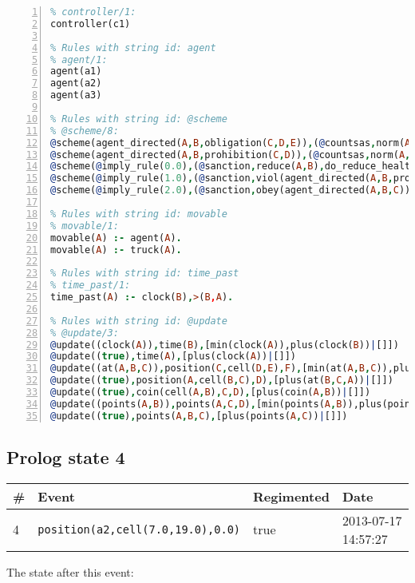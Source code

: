 \documentclass[11pt]{article}\usepackage[utf8]{inputenc}\usepackage{geometry}
\begin{document}
\begin{lstlisting}[language=Prolog, numbers=left]
% Rules with string id: controller
% controller/1:
controller(c1)

% Rules with string id: agent
% agent/1:
agent(a1)
agent(a2)
agent(a3)

% Rules with string id: @scheme
% @scheme/8:
@scheme(agent_directed(A,B,obligation(C,D,E)),(@countsas,norm(A,B,F,obligation(C,D,E)),F),false,(listTrue(C)),(time_past(D)),false,[plus(viol(agent_directed(A,B,obligation(C,D,E))))|[]],[plus(obey(agent_directed(A,B,obligation(C,D,E))))|[]])
@scheme(agent_directed(A,B,prohibition(C,D)),(@countsas,norm(A,B,E,prohibition(C,D)),E),(listTrue(C)),false,(false),false,[plus(viol(agent_directed(A,B,prohibition(C,D))))|[]],[plus(obey(agent_directed(A,B,prohibition(C,D))))|[]])
@scheme(@imply_rule(0.0),(@sanction,reduce(A,B),do_reduce_health(A,B),notifyAgent(A,changed(status))),true,false,false,false,[min(reduce(A,B))|[]],[])
@scheme(@imply_rule(1.0),(@sanction,viol(agent_directed(A,B,prohibition(C,D))),do_sanction(D)),true,false,false,false,[min(viol(agent_directed(A,B,prohibition(C,D))))|[]],[])
@scheme(@imply_rule(2.0),(@sanction,obey(agent_directed(A,B,C))),true,false,false,false,[min(obey(agent_directed(A,B,C)))|[]],[])

% Rules with string id: movable
% movable/1:
movable(A) :- agent(A).
movable(A) :- truck(A).

% Rules with string id: time_past
% time_past/1:
time_past(A) :- clock(B),>(B,A).

% Rules with string id: @update
% @update/3:
@update((clock(A)),time(B),[min(clock(A)),plus(clock(B))|[]])
@update((true),time(A),[plus(clock(A))|[]])
@update((at(A,B,C)),position(C,cell(D,E),F),[min(at(A,B,C)),plus(at(D,E,C))|[]])
@update((true),position(A,cell(B,C),D),[plus(at(B,C,A))|[]])
@update((true),coin(cell(A,B),C,D),[plus(coin(A,B))|[]])
@update((points(A,B)),points(A,C,D),[min(points(A,B)),plus(points(A,D))|[]])
@update((true),points(A,B,C),[plus(points(A,C))|[]])

\end{lstlisting}
\clearpage 
\subsection{Prolog state 4}
\begin{table}[ht]
\centering 
\begin{tabular}{l l l l} 
\textbf{\#} & \textbf{Event} & \textbf{Regimented} & \textbf{Date} \\ [0.5ex] 
\hline
4&\texttt{position(a2,cell(7.0,19.0),0.0)}&true&2013-07-17 14:57:27\\ [1ex] \hline\end{tabular}
\end{table}
The state after this event:
\end{document}
